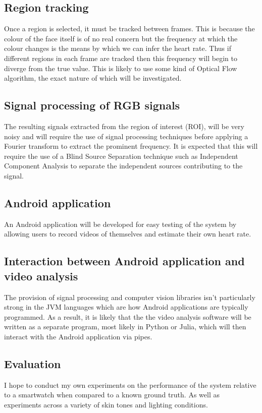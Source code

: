\subsection*{Region tracking}
Once a region is selected, it must be tracked between frames. This is because the colour of the face itself is of no real concern but the frequency at which the colour changes is the means by which we can infer the heart rate. Thus if different regions in each frame are tracked then this frequency will begin to diverge from the true value. This is likely to use some kind of Optical Flow algorithm, the exact nature of which will be investigated.

\subsection*{Signal processing of RGB signals}
The resulting signals extracted from the region of interest (ROI), will be very noisy and will require the use of signal processing techniques before applying a Fourier transform to extract the prominent frequency. It is expected that this will require the use of a Blind Source Separation technique such as Independent Component Analysis to separate the independent sources contributing to the signal.

\subsection*{Android application}
An Android application will be developed for easy testing of the system by allowing users to record videos of themselves and estimate their own heart rate.

\subsection*{Interaction between Android application and video analysis}
The provision of signal processing and computer vision libraries isn’t particularly strong in the JVM languages which are how Android applications are typically programmed. As a result, it is likely that the the video analysis software will be written as a separate program, most likely in Python or Julia, which will then interact with the Android application via pipes. 

\subsection*{Evaluation}
I hope to conduct my own experiments on the performance of the system relative to a smartwatch when compared to a known ground truth. As well as experiments across a variety of skin tones and lighting conditions.

